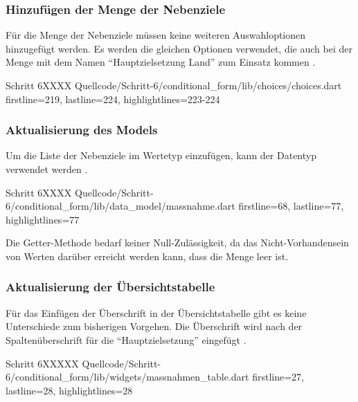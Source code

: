 \subsubsection{Hinzufügen der Menge der Nebenziele}

Für die Menge der Nebenziele müssen keine weiteren Auswahloptionen hinzugefügt werden.
Es werden die gleichen Optionen verwendet,
die auch bei der Menge  mit dem Namen \enquote{Hauptzielsetzung Land} zum Einsatz kommen .

\begin{alexlisting}{Schritt 6}{XXXX}
  {Quellcode/Schritt-6/conditional_form/lib/choices/choices.dart}
  {firstline=219, lastline=224, highlightlines={223-224}}
  \label{lst:Schritt6nebenzielsetzungLandChoices}
\end{alexlisting}

\subsubsection{Aktualisierung des Models}

Um die Liste der Nebenziele im Wertetyp  einzufügen,
kann der Datentyp  verwendet werden .
\begin{alexlisting}{Schritt 6}{XXXX}
  {Quellcode/Schritt-6/conditional_form/lib/data_model/massnahme.dart}
  {firstline=68, lastline=77, highlightlines={77}}
  \label{lst:Schritt6MassnahmenCharakteristika}
\end{alexlisting}
Die Getter-Methode  bedarf keiner Null-Zulässigkeit,
da das Nicht-Vorhandensein von Werten darüber erreicht werden kann,
dass die Menge leer ist.




\subsubsection{Aktualisierung der Übersichtstabelle}

Für das Einfügen der Überschrift in der Übersichtstabelle gibt es keine Unterschiede zum bisherigen Vorgehen.
Die Überschrift wird nach der Spaltenüberschrift für die \enquote{Hauptzielsetzung} eingefügt .

\begin{alexlisting}{Schritt 6}{XXXXX}
  {Quellcode/Schritt-6/conditional_form/lib/widgets/massnahmen_table.dart}
  {firstline=27, lastline=28, highlightlines={28}}
  \label{lst:Schritt6buildColumnHeader}
\end{alexlisting}

